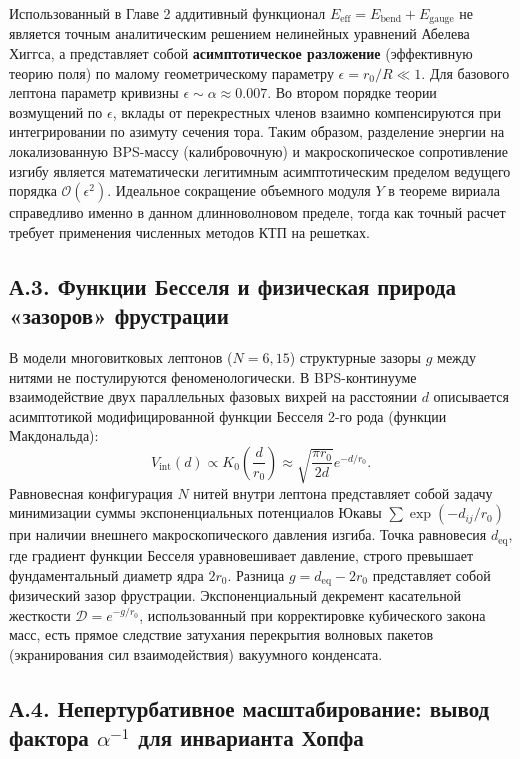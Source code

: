 \documentclass[11pt,a4paper]{article}
\begin{document}
	Использованный в Главе 2 аддитивный функционал $E_{\text{eff}} = E_{\text{bend}} + E_{\text{gauge}}$ не является точным аналитическим решением нелинейных уравнений Абелева Хиггса, а представляет собой \textbf{асимптотическое разложение} (эффективную теорию поля) по малому геометрическому параметру $\epsilon = r_0 / R \ll 1$.
	Для базового лептона параметр кривизны $\epsilon \sim \alpha \approx 0.007$. Во втором порядке теории возмущений по $\epsilon$, вклады от перекрестных членов взаимно компенсируются при интегрировании по азимуту сечения тора. Таким образом, разделение энергии на локализованную BPS-массу (калибровочную) и макроскопическое сопротивление изгибу является математически легитимным асимптотическим пределом ведущего порядка $\mathcal{O}(\epsilon^2)$. Идеальное сокращение объемного модуля $Y$ в теореме вириала справедливо именно в данном длинноволновом пределе, тогда как точный расчет требует применения численных методов КТП на решетках.
	
	\subsection*{А.3. Функции Бесселя и физическая природа «зазоров» фрустрации}
	В модели многовитковых лептонов ($N=6, 15$) структурные зазоры $g$ между нитями не постулируются феноменологически. В BPS-континууме взаимодействие двух параллельных фазовых вихрей на расстоянии $d$ описывается асимптотикой модифицированной функции Бесселя 2-го рода (функции Макдональда):
	\begin{equation}
		V_{\text{int}}(d) \propto K_0\left(\frac{d}{r_0}\right) \approx \sqrt{\frac{\pi r_0}{2d}} e^{-d/r_0}.
	\end{equation}
	Равновесная конфигурация $N$ нитей внутри лептона представляет собой задачу минимизации суммы экспоненциальных потенциалов Юкавы $\sum \exp(-d_{ij}/r_0)$ при наличии внешнего макроскопического давления изгиба. Точка равновесия $d_{\text{eq}}$, где градиент функции Бесселя уравновешивает давление, строго превышает фундаментальный диаметр ядра $2r_0$. 
	Разница $g = d_{\text{eq}} - 2r_0$ представляет собой физический зазор фрустрации. Экспоненциальный декремент касательной жесткости $\mathcal{D} = e^{-g/r_0}$, использованный при корректировке кубического закона масс, есть прямое следствие затухания перекрытия волновых пакетов (экранирования сил взаимодействия) вакуумного конденсата.
	
	\subsection*{А.4. Непертурбативное масштабирование: вывод фактора $\alpha^{-1}$ для инварианта Хопфа}
	
\end{document}
